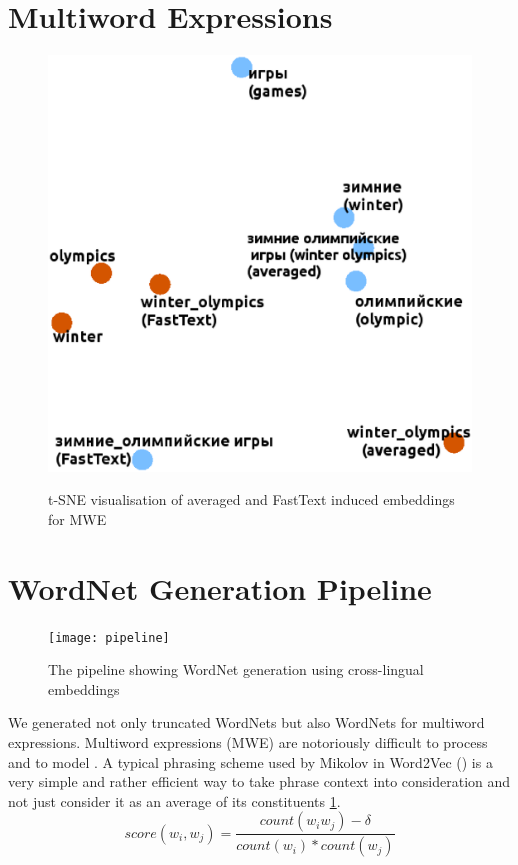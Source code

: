 \documentclass[conference]{IEEEtran}
\begin{document}
	\section{Multiword Expressions}
	\begin{figure}
		
		\centering
		\small
		\includegraphics[scale=0.4]{mwe}\\
		
		\caption{t-SNE visualisation of averaged and FastText induced embeddings for MWE}
		\label{mwe}
	\end{figure}
	
	\section{WordNet Generation Pipeline}
	\begin{figure}
		
		\centering
		\small
		\texttt{[image: pipeline]}\\
		
		\caption{The pipeline showing WordNet generation using cross-lingual embeddings}
		\label{pipeline}
	\end{figure}
	
	
	We generated not only truncated WordNets but also WordNets for multiword expressions. Multiword expressions (MWE) are notoriously difficult to process and to model \cite{sag2002multiword}. A typical phrasing scheme used by Mikolov in Word2Vec (\citeyear{mikolov-representations-2013}) is a very simple	and rather efficient way to take phrase context into consideration and not just consider it as an average of its constituents \ref{mwe}.
	$$score(w_i, w_j) = \frac{count(w_iw_j) - \delta}{count(w_i) * count(w_j)}$$
	
\end{document}
